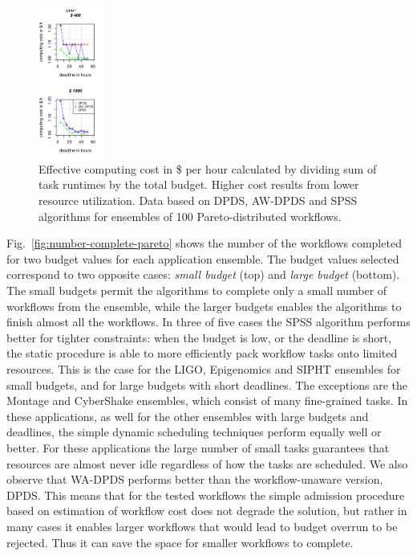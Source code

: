 \documentclass{sig-alternate}
\begin{document}
\begin{figure}[htb]
\includegraphics[width=0.19\textwidth]{figures/pareto-cost-SIPHT-n-1000-8-dagh5-50m0.pdf}
\caption{Effective computing cost in \$ per hour calculated by dividing sum of
task runtimes by the total budget. Higher cost results from lower resource utilization. Data based on DPDS, AW-DPDS and SPSS algorithms for ensembles of 100
Pareto-distributed workflows.}
\label{fig:cost}
\end{figure}

Fig.~\ref{fig:number-complete-pareto} shows the number of the workflows
completed for two budget values for each application ensemble. The budget values
selected correspond to two opposite cases: {\em small budget} (top) and {\em
large budget} (bottom). The small budgets permit the algorithms to complete 
only a small number of workflows from the ensemble, while the larger budgets 
enables the algorithms to finish almost all the workflows. In three of five 
cases the SPSS algorithm performs better for tighter constraints: when the 
budget is low, or the deadline is short, the static procedure is able to more 
efficiently pack workflow tasks onto limited resources. This is the case for 
the LIGO, Epigenomics and SIPHT ensembles for small budgets, and for large
budgets with short deadlines. The exceptions are the Montage and CyberShake 
ensembles,  which consist of many fine-grained tasks. In these applications, 
as well for the other ensembles with large budgets and deadlines, the simple 
dynamic scheduling techniques perform equally well or better. For these 
applications the large number of small tasks guarantees that resources 
are almost never idle regardless of how the tasks are scheduled. We also 
observe that WA-DPDS performs better than the workflow-unaware version, DPDS. 
This means that for the tested workflows the simple admission procedure based 
on estimation of workflow cost does not degrade the solution, but rather in 
many cases it enables larger workflows that would lead to budget overrun to
be rejected. Thus it can save the space for smaller workflows to complete.
\end{document}
